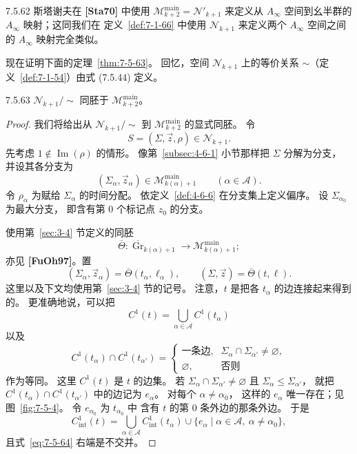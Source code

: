 \begin{remark}{7.5.62}\label{rem:7-5-62}
斯塔谢夫在 \textbf{[Sta70]} 中使用
$\mathcal M_{k+2}^{\mathrm{main}}=\mathcal N'_{k+1}$
来定义从 $A_\infty$ 空间到幺半群的
$A_\infty$ 映射；这同我们在
定义~\ref{def:7-1-66} 中使用 $\mathcal N_{k+1}$
来定义两个 $A_\infty$ 空间之间的
$A_\infty$ 映射完全类似。
\end{remark}

现在证明下面的定理~\ref{thm:7-5-63}。
回忆，空间 $\mathcal N_{k+1}$ 上的等价关系
$\sim$（定义~\ref{def:7-1-54}）由式 (7.5.44) 定义。

\begin{theorem}{7.5.63}\label{thm:7-5-63}
$\mathcal N_{k+1}/\!\sim$ 同胚于
$\mathcal M_{k+2}^{\mathrm{main}}$。
\end{theorem}

\begin{proof}
我们将给出从 $\mathcal N_{k+1}/\!\sim$
到 $\mathcal M_{k+2}^{\mathrm{main}}$ 的显式同胚。
令
\[
S=(\Sigma,\vec z,\rho)\in\mathcal N_{k+1}.
\]
先考虑 $1\notin\operatorname{Im}(\rho)$ 的情形。
像第~\ref{subsec:4-6-1} 小节那样把 $\Sigma$ 分解为分支，
并设其各分支为
\[
(\Sigma_\alpha,\vec z_\alpha)
\in\mathcal M_{k(\alpha)+1}^{\mathrm{main}}
\qquad(\alpha\in\mathcal A).
\]
令 $\rho_\alpha$ 为赋给 $\Sigma_\alpha$ 的时间分配。
依定义~\ref{def:4-6-6} 在分支集上定义偏序。
设 $\Sigma_{\alpha_0}$ 为最大分支，
即含有第 $0$ 个标记点 $z_0$ 的分支。

使用第~\ref{sec:3-4} 节定义的同胚
\[
\overline\Theta\colon
\overline{\operatorname{Gr}}_{k(\alpha)+1}
\longrightarrow
\mathcal M_{k(\alpha)+1}^{\mathrm{main}};
\]
亦见 \textbf{[FuOh97]}。置
\[
(\Sigma_\alpha,\vec z_\alpha)
=\overline\Theta(t_\alpha,\ell_\alpha),
\qquad
(\Sigma,\vec z)=\overline\Theta(t,\ell).
\]
这里以及下文均使用第~\ref{sec:3-4} 节的记号。
注意，$t$ 是把各 $t_\alpha$ 的边连接起来得到的。
更准确地说，可以把
\[
C^1(t)=\bigcup_{\alpha\in\mathcal A}C^1(t_\alpha)
\]
以及
\[
C^1(t_\alpha)\cap C^1(t_{\alpha'})=
\begin{cases}
\text{一条边},&\Sigma_\alpha\cap\Sigma_{\alpha'}\ne\varnothing,\\
\varnothing,&\text{否则}
\end{cases}
\]
作为等同。
这里 $C^1(t)$ 是 $t$ 的边集。
若 $\Sigma_\alpha\cap\Sigma_{\alpha'}\ne\varnothing$
且 $\Sigma_\alpha\leq\Sigma_{\alpha'}$，
就把
$C^1(t_\alpha)\cap C^1(t_{\alpha'})$
中的边记为 $e_\alpha$。
对每个 $\alpha\ne\alpha_0$，
这样的 $e_\alpha$ 唯一存在；见图~\ref{fig:7-5-4}。
令 $e_{\alpha_0}$ 为 $t_{\alpha_0}$ 中
含有 $t$ 的第 $0$ 条外边的那条外边。
于是
\begin{equation}
C^1_{\mathrm{int}}(t)
=\bigcup_{\alpha\in\mathcal A}C^1_{\mathrm{int}}(t_\alpha)
 \cup\{e_\alpha\mid
       \alpha\in\mathcal A,\ \alpha\ne\alpha_0\},
\tag{7.5.64}\label{eq:7-5-64}
\end{equation}
且式~\eqref{eq:7-5-64} 右端是不交并。


\end{proof}
